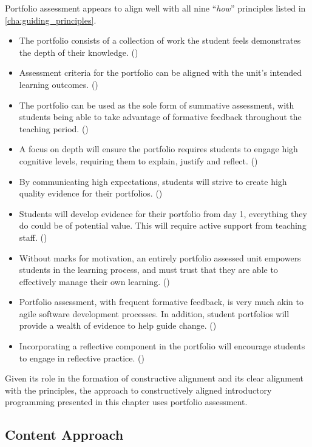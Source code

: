 Portfolio assessment appears to align well with all nine ``\emph{how}'' principles listed in \cref{cha:guiding_principles}. 
\begin{itemize}[noitemsep,nolistsep]
	\item The portfolio consists of a collection of work the student feels demonstrates the depth of their knowledge. ()
	\item Assessment criteria for the portfolio can be aligned with the unit's intended learning outcomes. ()
	\item The portfolio can be used as the sole form of summative assessment, with students being able to take advantage of formative feedback throughout the teaching period. ()
	\item A focus on depth will ensure the portfolio requires students to engage high cognitive levels, requiring them to explain, justify and reflect. ()
	\item By communicating high expectations, students will strive to create high quality evidence for their portfolios. ()
	\item Students will develop evidence for their portfolio from day 1, everything they do could be of potential value. This will require active support from teaching staff. ()
	\item Without marks for motivation, an entirely portfolio assessed unit empowers students in the learning process, and must trust that they are able to effectively manage their own learning. ()
	\item Portfolio assessment, with frequent formative feedback, is very much akin to agile software development processes. In addition, student portfolios will provide a wealth of evidence to help guide change. ()
	\item Incorporating a reflective component in the portfolio will encourage students to engage in reflective practice. ()
\end{itemize}

Given its role in the formation of constructive alignment and its clear alignment with the principles, the approach to constructively aligned introductory programming presented in this chapter uses portfolio assessment.


\subsection{Content Approach} %
\label{sub:content_approach}

